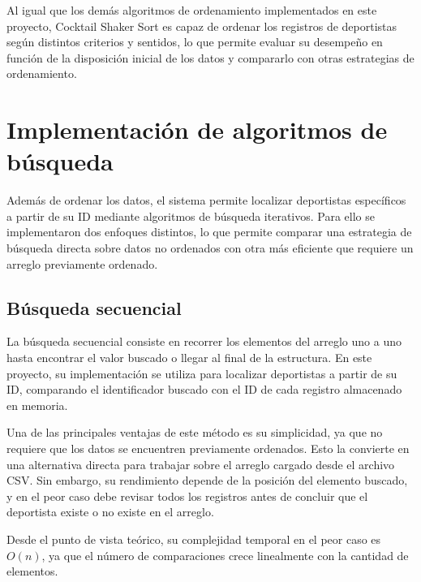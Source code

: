 Al igual que los demás algoritmos de ordenamiento implementados en este proyecto, Cocktail Shaker Sort es capaz de ordenar los registros de deportistas según distintos criterios y sentidos, lo que permite evaluar su desempeño en función de la disposición inicial de los datos y compararlo con otras estrategias de ordenamiento.

\section{Implementación de algoritmos de búsqueda}
Además de ordenar los datos, el sistema permite localizar deportistas específicos a partir de su ID mediante algoritmos de búsqueda iterativos. Para ello se implementaron dos enfoques distintos, lo que permite comparar una estrategia de búsqueda directa sobre datos no ordenados con otra más eficiente que requiere un arreglo previamente ordenado.

\subsection{Búsqueda secuencial}
La búsqueda secuencial consiste en recorrer los elementos del arreglo uno a uno hasta encontrar el valor buscado o llegar al final de la estructura. En este proyecto, su implementación se utiliza para localizar deportistas a partir de su ID, comparando el identificador buscado con el ID de cada registro almacenado en memoria.

Una de las principales ventajas de este método es su simplicidad, ya que no requiere que los datos se encuentren previamente ordenados. Esto la convierte en una alternativa directa para trabajar sobre el arreglo cargado desde el archivo CSV. Sin embargo, su rendimiento depende de la posición del elemento buscado, y en el peor caso debe revisar todos los registros antes de concluir que el deportista existe o no existe en el arreglo.

Desde el punto de vista teórico, su complejidad temporal en el peor caso es \(O(n)\), ya que el número de comparaciones crece linealmente con la cantidad de elementos.

